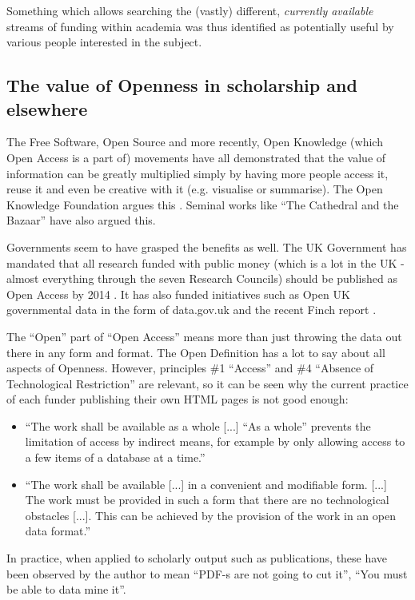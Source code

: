 Something which allows searching the (vastly) different, \emph{currently available} streams of funding within academia was thus identified as potentially useful by various people interested in the subject.

\subsection{The value of Openness in scholarship and elsewhere}
The Free Software, Open Source and more recently, Open Knowledge (which Open Access is a part of) movements have all demonstrated that the value of information can be greatly multiplied simply by having more people access it, reuse it and even be creative with it (e.g. visualise or summarise). The Open Knowledge Foundation argues this \cite{okfn-vision}. Seminal works like ``The Cathedral and the Bazaar'' \cite{catb} have also argued this.

Governments seem to have grasped the benefits as well. The UK Government has mandated that all research funded with public money (which is a lot in the UK - almost everything through the seven Research Councils) should be published as Open Access by 2014 \cite{guardian-ukgov-oa2014}. It has also funded initiatives such as Open UK governmental data in the form of data.gov.uk \cite{open-uk-gov-data} and the recent Finch report \cite{guardian-finch} \cite{finch}.

The ``Open'' part of ``Open Access'' means more than just throwing the data out there in any form and format. The Open Definition \cite{od} has a lot to say about all aspects of Openness. However, principles \#1 ``Access'' and \#4 ``Absence of Technological Restriction'' are relevant, so it can be seen why the current practice of each funder publishing their own HTML pages is not good enough:

\begin{itemize}
 \item ``The work shall be available as a whole [...] ``As a whole'' prevents the limitation of access by indirect means, for example by only allowing access to a few items of a database at a time.''
 \item ``The work shall be available [...] in a convenient and modifiable form. [...] The work must be provided in such a form that there are no technological obstacles [...]. This can be achieved by the provision of the work in an open data format.''
\end{itemize}

In practice, when applied to scholarly output such as publications, these have been observed by the author to mean ``PDF-s are not going to cut it'', ``You must be able to data mine it''.

